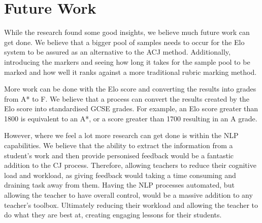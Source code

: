 

\section{Future Work}
\label{sec:conclusion_future_wk}

While the research found some good insights, we believe much future work can get done. We believe that a bigger pool of samples needs to occur for the Elo system to be assured as an alternative to the ACJ method. Additionally, introducing the markers and seeing how long it takes for the sample pool to be marked and how well it ranks against a more traditional rubric marking method.

More work can be done with the Elo score and converting the results into grades from A* to F. We believe that a process can convert the results created by the Elo score into standardised GCSE grades. For example, an Elo score greater than 1800 is equivalent to an A*, or a score greater than 1700 resulting in an A grade.

However, where we feel a lot more research can get done is within the NLP capabilities. We believe that the ability to extract the information from a student's work and then provide personised feedback would be a fantastic addition to the CJ process. Therefore, allowing teachers to reduce their cognitive load and workload, as giving feedback would taking a time consuming and draining task away from them. Having the NLP processes automated, but allowing the teacher to have overall control, would be a massive addition to any teacher's toolbox. Ultimately reducing their workload and allowing the teacher to do what they are best at, creating engaging lessons for their students.
